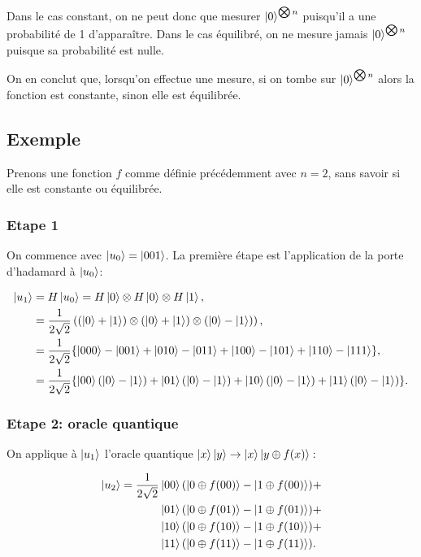 Dans le cas constant, on ne peut donc que mesurer $\ket{0}^{\bigotimes n}$ puisqu'il a une probabilité de 1 d'apparaître. Dans le cas équilibré, on ne mesure jamais $\ket{0}^{\bigotimes n}$ puisque sa probabilité est nulle.

On en conclut que, lorsqu'on effectue une mesure, si on tombe sur $\ket{0}^{\bigotimes n}$ alors la fonction est constante, sinon elle est équilibrée.


\subsection{Exemple}

Prenons une fonction $f$ comme définie précédemment avec $n=2$, sans
savoir si elle est constante ou équilibrée.

\subsubsection{Etape 1}


On commence avec $\ket{u_0} = \ket{001}$. La première étape est
l'application de la porte d'hadamard à $\ket{u_0}$:

\begin{align}
\ket{u_1} &= H\ket{u_0} = H\ket{0} \otimes H\ket{0} \otimes H\ket{1} \nonumber ,\\
& = \frac{1}{2\sqrt{2}} \left( (\ket{0} + \ket{1})\otimes(\ket{0} + \ket{1})\otimes(\ket{0} - \ket{1}) \right) \nonumber ,\\
 & = \frac{1}{2\sqrt{2}}\{\ket{000} - \ket{001} + \ket{010} - \ket{011} + \ket{100} - \ket{101} + \ket{110} - \ket{111}\} \nonumber ,\\
& = \frac{1}{2\sqrt{2}}\{\ket{00}(\ket{0} - \ket{1}) + \ket{01}(\ket{0} - \ket{1}) + \ket{10}(\ket{0} - \ket{1}) + \ket{11}(\ket{0} - \ket{1})\} .
\end{align}


\subsubsection{Etape 2: oracle quantique}

On applique à $\ket{u_1}$ l'oracle quantique $\ket{x}\ket{y}\rightarrow\ket{x}\ket{y\oplus f(x)}:$

\begin{align*}
\ket{u_2}  =  \frac{1}{2\sqrt{2}}  & \ket{00}(\ket{0 \oplus f(00)} - \ket{1 \oplus f(00)}) + \\
& \ket{01}(\ket{0 \oplus f(01)} - \ket{1 \oplus f(01)}) + \\
& \ket{10}(\ket{0 \oplus f(10)} - \ket{1 \oplus f(10)}) + \\
& \ket{11}(\ket{0 \oplus f(11)} - \ket{1 \oplus f(11)}).
\end{align*}


